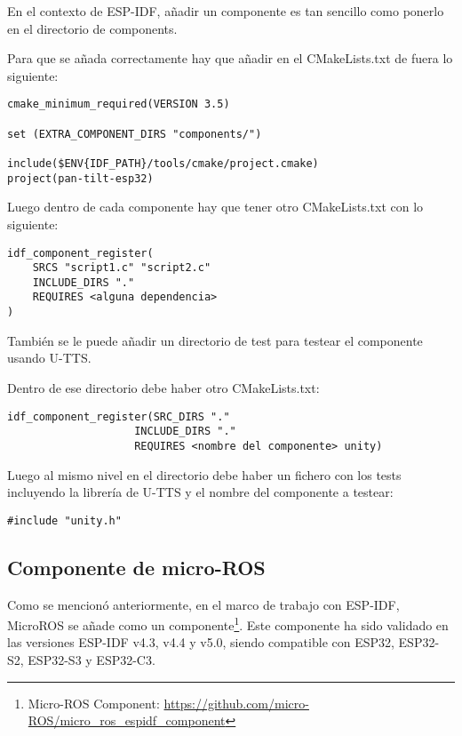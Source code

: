 En el contexto de ESP-IDF, añadir un componente es tan sencillo como ponerlo en el directorio de components.

Para que se añada correctamente hay que añadir en el CMakeLists.txt de fuera lo siguiente:

\begin{lstlisting}[label={lst:CMakeLists-extern-ESP-IDF}, caption=CMakeLists del repositorio ESP-IDF]
cmake_minimum_required(VERSION 3.5)

set (EXTRA_COMPONENT_DIRS "components/")

include($ENV{IDF_PATH}/tools/cmake/project.cmake)
project(pan-tilt-esp32)
\end{lstlisting}

Luego dentro de cada componente hay que tener otro CMakeLists.txt con lo siguiente:
\begin{lstlisting}[label={lst:CMakeLists-component-ESP-IDF}, caption=CMakeLists del componente ESP-IDF]
idf_component_register(
    SRCS "script1.c" "script2.c"
    INCLUDE_DIRS "."
    REQUIRES <alguna dependencia>
)
\end{lstlisting}

También se le puede añadir un directorio de test para testear el componente usando U-TTS.



Dentro de ese directorio debe haber otro CMakeLists.txt:
\begin{lstlisting}[label={lst:CMakeLists-component-tests}, caption=CMakeLists de los tests del componente]
idf_component_register(SRC_DIRS "."
                    INCLUDE_DIRS "."
                    REQUIRES <nombre del componente> unity)
\end{lstlisting}

Luego al mismo nivel en el directorio debe haber un fichero con los tests incluyendo la librería de U-TTS y el nombre del componente a testear:

\begin{verbatim}
#include "unity.h"
\end{verbatim}



\subsection{Componente de micro-ROS}
\label{subsection:microroscomponent}

Como se mencionó anteriormente, en el marco de trabajo con ESP-IDF, MicroROS se añade como un componente\footnote{Micro-ROS Component: \url{https://github.com/micro-ROS/micro_ros_espidf_component}}. Este componente ha sido validado en las versiones ESP-IDF v4.3, v4.4 y v5.0, siendo compatible con ESP32, ESP32-S2, ESP32-S3 y ESP32-C3.

